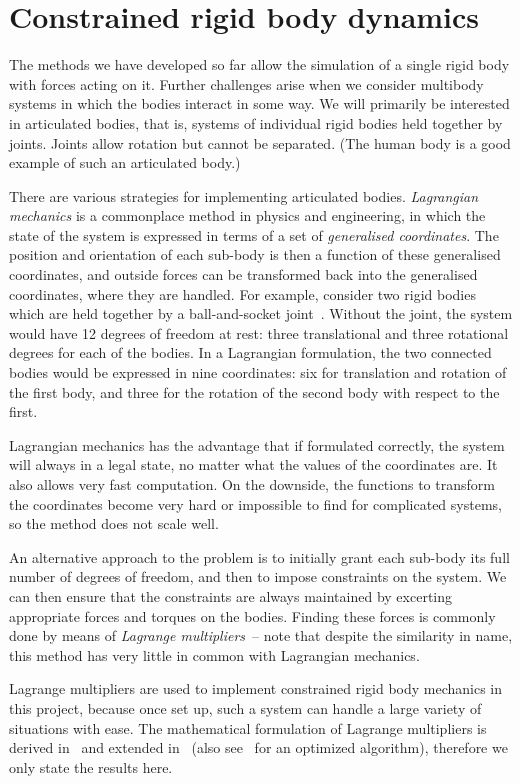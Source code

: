 \section{Constrained rigid body dynamics\label{constraints}}
The methods we have developed so far allow the simulation of a single rigid body with forces
acting on it. Further challenges arise when we consider multibody systems in which the bodies
interact in some way. We will primarily be interested in articulated bodies, that is, systems
of individual rigid bodies held together by joints. Joints allow rotation but cannot be
separated. (The human body is a good example of such an articulated body.)

There are various strategies for implementing articulated bodies. \emph{Lagrangian mechanics}
is a commonplace method in physics and engineering, in which the state of the system is expressed
in terms of a set of \emph{generalised coordinates}. The position and orientation of each sub-body
is then a function of these generalised coordinates, and outside forces can be transformed
back into the generalised coordinates, where they are handled. For example, consider two rigid
bodies which are held together by a ball-and-socket joint~\cite{Kalra:95}. Without the joint,
the system would have 12 degrees of freedom at rest: three translational and three rotational
degrees for each of the bodies. In a Lagrangian formulation, the two connected bodies would be
expressed in nine coordinates: six for translation and rotation of the first body, and three
for the rotation of the second body with respect to the first.

Lagrangian mechanics has the advantage that if formulated correctly, the system will always in a
legal state, no matter what the values of the coordinates are. It also allows very fast
computation. On the downside, the functions to transform the coordinates become very hard or
impossible to find for complicated systems, so the method does not scale well.

An alternative approach to the problem is to initially grant each sub-body its full number of
degrees of freedom, and then to impose constraints on the system. We can then ensure that the
constraints are always maintained by excerting appropriate forces and torques on the bodies.
Finding these forces is commonly done by means of \emph{Lagrange multipliers}~-- note that
despite the similarity in name, this method has very little in common with Lagrangian mechanics.

Lagrange multipliers are used to implement constrained rigid body mechanics in this project,
because once set up, such a system can handle a large variety of situations with ease.
The mathematical formulation of Lagrange multipliers is derived in~\cite{BaraffWitkin:97} and
extended in~\cite{Saunders:PhD} (also see~\cite{Baraff:96} for an optimized algorithm),
therefore we only state the results here.

